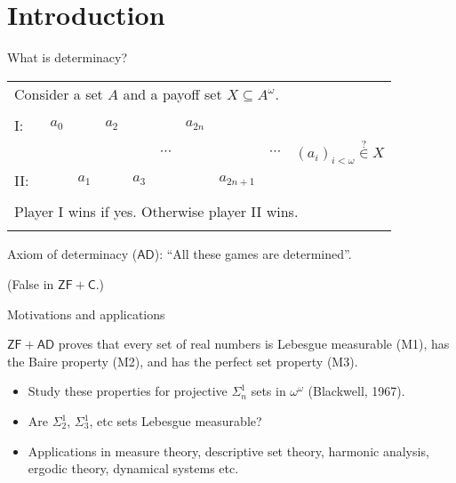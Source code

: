\documentclass{beamer} %
\begin{document}
\section{Introduction}

\begin{frame}{What is determinacy?}
    
    \begin{tabular}{llllllllll}
        \multicolumn{10}{l}{Consider a set $A$ and a payoff set $X \subseteq A^{\omega}$.}\\
        &&&&&&&&&\\
        I:\ & $a_0$ &       & $a_2$ &       &          &$a_{2n}$   &           & & \\
            &       &       &       &       & $\cdots$ &           &           & $\cdots$ & \qquad ${(a_i)}_{i < \omega} \overset{?}{\in} X$\\
        II:\ &       & $a_1$ &       & $a_3$ &          &           &$a_{2n+1}$ & & \\
        &&&&&&&&&\\
        \multicolumn{10}{l}{Player I wins if yes. Otherwise player II wins.} \\ 
        &&&&&&&&&\\
    \end{tabular}

    Axiom of determinacy ($\mathsf{AD}$): ``All these games are determined''.
    
    (False in $\mathsf{ZF + C}$.)
\end{frame}


\begin{frame}{Motivations and applications}

    \begin{theorem}
        $\mathsf{ZF + AD}$ proves  that every set of real numbers is Lebesgue measurable (M1), has 
        the Baire property (M2), and has the perfect set property (M3).
    \end{theorem}

    \begin{itemize}
        \item<2-> Study these properties for projective $\Sigma^1_n$ sets in $\omega^{\omega}$
        (Blackwell, 1967).
        \item<3-> Are $\Sigma^1_2$, $\Sigma^1_3$, etc sets Lebesgue measurable?
        \item<4> Applications in measure theory, descriptive set theory, harmonic analysis, ergodic theory, 
        dynamical systems etc.
    \end{itemize}

\end{frame}
\end{document}
